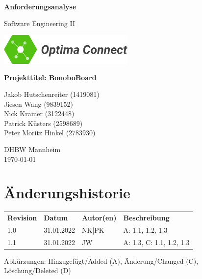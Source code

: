 \documentclass[a4paper,11pt]{scrartcl}
\begin{document}
\renewcommand*{\arraystretch}{1.2}
\begin{titlepage}
    \begin{center}
        \vspace*{1cm}\Huge
        \textbf{Anforderungsanalyse}\par                
        \vspace{0.5cm}\LARGE        
        Software Engineering II\par           
        \vspace{2cm}
        \includegraphics[width=0.5\textwidth]{OptimaLogo_long}\par   
        \vspace{1cm}
        \textbf{Projekttitel: BonoboBoard}\par        
        \vfill\Large   
        Jakob Hutschenreiter (1419081)\\Jiesen Wang (9839152)\\Nick Kramer (3122448)\\Patrick Küsters (2598689)\\Peter Moritz Hinkel (2783930)\par
        \vspace{2cm}
        DHBW Mannheim\\
        \today     
    \end{center}
\end{titlepage}

\section*{Änderungshistorie}
\begin{table}[h]
	\begin{tabular}{@{} p{20mm} p{25mm} p{25mm} p{75mm}}
		\textbf{Revision} & \textbf{Datum} & \textbf{Autor(en)} & \textbf{Beschreibung}\\
		1.0 & 31.01.2022 & NK|PK & A: 1.1, 1.2, 1.3\\
		1.1 & 31.01.2022 & JW & A: 1.3, C: 1.1, 1.2, 1.3 
	\end{tabular}
\end{table}
\noindent
Abkürzungen: Hinzugefügt/Added (A), Änderung/Changed (C), Löschung/Deleted (D)
\vspace{2cm}
\tableofcontents
\newpage
{}
\end{document}
